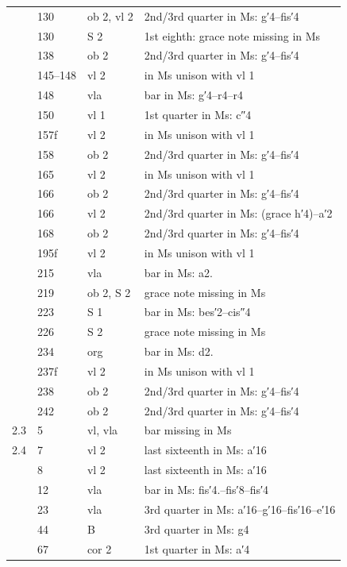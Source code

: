 \documentclass[parskip=full]{scrreprt}
\begin{document}
\begin{longtable}{lll L{10cm}}
	     & 130 & ob 2, vl 2 & 2nd/3rd quarter in Ms: g′4–fis′4 \\
	     & 130 & S 2     & 1st eighth: grace note missing in Ms \\
	     & 138 & ob 2    & 2nd/3rd quarter in Ms: g′4–fis′4 \\
	     & 145–148 & vl 2 & in Ms unison with vl 1 \\
	     & 148 & vla     & bar in Ms: g′4–r4–r4 \\
	     & 150 & vl 1    & 1st quarter in Ms: c″4 \\
	     & 157f & vl 2   & in Ms unison with vl 1 \\
	     & 158 & ob 2    & 2nd/3rd quarter in Ms: g′4–fis′4 \\
	     & 165 & vl 2    & in Ms unison with vl 1 \\
	     & 166 & ob 2    & 2nd/3rd quarter in Ms: g′4–fis′4 \\
	     & 166 & vl 2    & 2nd/3rd quarter in Ms: (grace h′4)–a′2 \\
	     & 168 & ob 2    & 2nd/3rd quarter in Ms: g′4–fis′4 \\
	     & 195f & vl 2   & in Ms unison with vl 1 \\
	     & 215 & vla     & bar in Ms: a2. \\
	     & 219 & ob 2, S 2 & grace note missing in Ms \\
	     & 223 & S 1     & bar in Ms: bes′2–cis″4 \\
	     & 226 & S 2     & grace note missing in Ms \\
	     & 234 & org     & bar in Ms: d2. \\
	     & 237f & vl 2   & in Ms unison with vl 1 \\
	     & 238 & ob 2    & 2nd/3rd quarter in Ms: g′4–fis′4 \\
	     & 242 & ob 2    & 2nd/3rd quarter in Ms: g′4–fis′4 \\
	2.3  & 5   & vl, vla & bar missing in Ms \\
	2.4  & 7   & vl 2    & last sixteenth in Ms: a′16 \\
	     & 8   & vl 2    & last sixteenth in Ms: a′16 \\
	     & 12  & vla     & bar in Ms: fis′4.–fis′8–fis′4 \\
	     & 23  & vla     & 3rd quarter in Ms: a′16–g′16–fis′16–e′16 \\
	     & 44  & B       & 3rd quarter in Ms: g4 \\
	     & 67  & cor 2   & 1st quarter in Ms: a′4 \\

\end{longtable}
\end{document}
